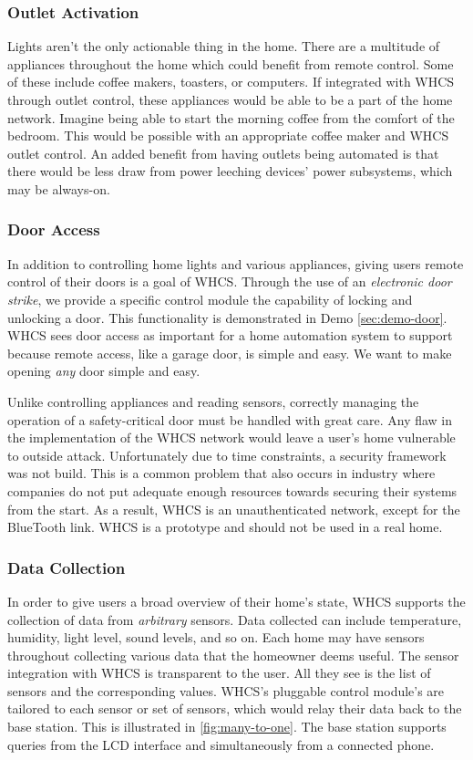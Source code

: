 \subsubsection{Outlet Activation}
Lights aren't the only actionable thing in the home. There are a multitude of
appliances throughout the home which could benefit from remote control. Some
of these include coffee makers, toasters, or computers.
If integrated with WHCS through outlet control, these appliances
would be able to be a part of the home network. Imagine being able to start the
morning coffee from the comfort of the bedroom. This would be possible with an
appropriate coffee maker and WHCS outlet control. An added benefit from having
outlets being automated is that there would be less draw from power leeching
devices' power subsystems, which may be always-on.

\subsubsection{Door Access}
In addition to controlling home lights and various appliances, giving users
remote control of their doors is a goal of WHCS. Through the use of an
\emph{electronic door strike}, we provide a specific control module the
capability of locking and unlocking a door. This functionality is
demonstrated in Demo \ref{sec:demo-door}. WHCS sees door access as important
for a home automation system to support because remote access, like a garage
door, is simple and easy. We want to make opening \emph{any} door simple and
easy.

Unlike controlling appliances and reading sensors, correctly managing the
operation of a safety-critical door must be handled with great care. Any flaw
in the implementation of the WHCS network would leave a user's home vulnerable
to outside attack. Unfortunately due to time constraints, a security framework
was not build. This is a common problem that also occurs in industry where
companies do not put adequate enough resources towards securing their systems
from the start. As a result, WHCS is an unauthenticated network, except for
the BlueTooth link. WHCS is a prototype and should not be used in a real home.

\subsubsection{Data Collection}
In order to give users a broad overview of their home's state, WHCS supports
the collection of data from \emph{arbitrary} sensors. Data collected can
include temperature, humidity, light level, sound levels, and so on. Each home
may have sensors throughout collecting various data that the homeowner deems
useful. The sensor integration with WHCS is transparent to the user. All
they see is the list of sensors and the corresponding values.
WHCS's pluggable control module's are tailored to each sensor or set of
sensors, which would relay their data back to the base station. This is
illustrated in \autoref{fig:many-to-one}. The base station supports
queries from the LCD interface and simultaneously from a connected phone.

